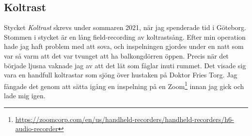 \documentclass{article}
\begin{document}


\subsection{Koltrast}
Stycket \emph{Koltrast} skrevs under sommaren 2021, när jag spenderade tid i Göteborg. Stommen i stycket är en
lång field-recording av koltrastsång. Efter min operation hade jag haft problem med att sova, och inspelningen
gjordes under en natt som var så varm att det var tvunget att ha balkongdörren öppen. Precis när det började
ljusna vaknade jag av att det lät som fåglar inuti rummet. Det visade sig vara en handfull koltrastar som
sjöng över hustaken på Doktor Fries Torg. Jag fångade det genom att sätta igång en inspelning på en  
Zoom\footnote{\url{https://zoomcorp.com/en/us/handheld-recorders/handheld-recorders/h6-audio-recorder}} innan
jag gick och lade mig igen. 
\end{document}
